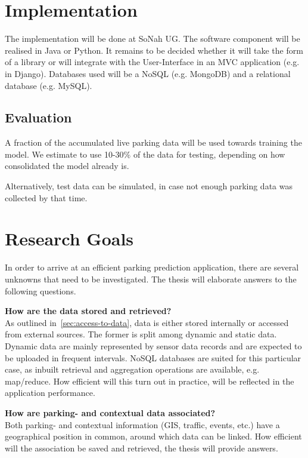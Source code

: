 \documentclass{article}
\begin{document}
 
\section{Implementation}
The implementation will be done at SoNah UG. The software component will be realised in Java or Python. It remains to be decided whether it will take the form of a library or will integrate with the User-Interface in an MVC application (e.g. in Django). Databases used will be a NoSQL (e.g. MongoDB) and a relational database (e.g. MySQL).

\subsection{Evaluation}
A fraction of the accumulated live parking data will be used towards training the model. We estimate to use  10-30\% of the data for testing, depending on how consolidated the model already is.

\vspace{2mm}
Alternatively, test data can be simulated, in case not enough parking data was collected by that time.

\section{Research Goals}
In order to arrive at an efficient parking prediction application, there are several unknowns that need to be investigated. The thesis will elaborate answers to the following questions.

\vspace{2mm}
\textbf{How are the data stored and retrieved?}\\
As outlined in~\ref{sec:access-to-data}, data is either stored internally or accessed from external sources. The former is split among dynamic and static data. Dynamic data are mainly represented by sensor data records and are expected to be uploaded in frequent intervals. NoSQL databases are suited for this particular case, as inbuilt retrieval and aggregation operations are available, e.g. map/reduce. How efficient will this turn out in practice, will be reflected in the application performance.

\vspace{2mm}
\textbf{How are parking- and contextual data associated?}\\
Both parking- and contextual information (GIS, traffic, events, etc.) have a geographical position in common, around which data can be linked. How efficient will the association be saved and retrieved, the thesis will provide answers.
\end{document}
